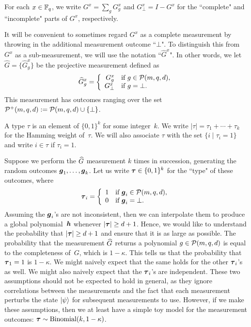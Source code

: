 \begin{definition}
For each $x \in \mathbb F_q$, we write $G^x = \sum_g G^x_g$ and $G^x_{\bot} = I - G^x$
for the ``complete" and ``incomplete" parts of $G^x$, respectively.

It will be convenient to sometimes regard $G^x$ as a complete measurement
by throwing in the additional measurement outcome ``$\bot$".
To distinguish this from $G^x$ as a sub-measurement,
we will use the notation ``$\widehat{G}^x$".
In other words, we let $\widehat{G} = \{\widehat{G}^x_g\}$
be the projective measurement defined as
\begin{equation*}
\widehat{G}^x_g
= \left\{\begin{array}{rl}
	G^x_g & \text{if } g \in \mathcal{P}(m, q, d),\\
	G^x_{\bot} & \text{if } g = \bot.
	\end{array}\right.
\end{equation*}
This measurement has outcomes ranging over the set 
$\mathcal{P}^+(m,q,d) := \mathcal{P}(m, q, d) \cup \{\bot\}$.
\end{definition}

\begin{definition}[Types]
A type $\tau$ is an element of $\{0, 1\}^k$ for some integer~$k$.
We write $|\tau| = \tau_1 + \cdots + \tau_k$ for the Hamming weight of~$\tau$.
We will also associate $\tau$ with the set $\{i \mid \tau_i = 1\}$ and write $i \in \tau$ if $\tau_i = 1$.
\end{definition}

Suppose we perform the $\widehat{G}$ measurement $k$ times in succession,
generating the random outcomes $\boldsymbol{g}_1, \ldots, \boldsymbol{g}_k$.
Let us write $\boldsymbol{\tau} \in \{0, 1\}^k$ for the ``type" of these outcomes, where
\begin{equation*}
\boldsymbol{\tau}_i =
\left\{\begin{array}{rl}
	1 & \text{if $\boldsymbol{g}_i \in \mathcal{P}(m, q, d)$},\\
	0 & \text{if $\boldsymbol{g}_i = \bot$.}
	\end{array}
	\right.
\end{equation*}
Assuming the $\boldsymbol{g}_i$'s are not inconsistent,
then we can interpolate them to produce a global polynomial~$\boldsymbol{h}$
whenever $|\boldsymbol{\tau}| \geq d+1$.
Hence, we would like to understand the probability that $|\boldsymbol{\tau}| \geq d+1$
and ensure that it is as large as possible.
The probability that the measurement $\widehat{G}$ returns a polynomial $g \in \mathcal{P}(m, q, d)$
is equal to the completeness of~$G$, which is $1-\kappa$.
This tells us that the probability that $\boldsymbol{\tau}_1 = 1$ is $1-\kappa$.
We might naively expect that the same holds for the other $\boldsymbol{\tau}_i$'s as well.
We might also naively expect that the $\boldsymbol{\tau}_i$'s are independent.
These two assumptions should not be expected to hold in general,
as they ignore correlations between the measurements
and the fact that each measurement perturbs the state $\ket{\psi}$ for subsequent measurements to use.
However, if we make these assumptions, then we at least have a simple toy model
for the measurement outcomes: $\boldsymbol{\tau} \sim \mathrm{Binomial}(k, 1-\kappa)$.

